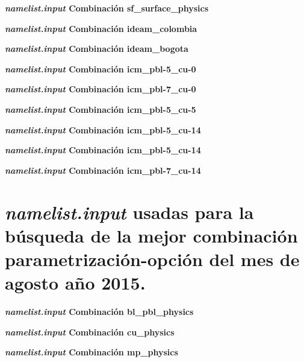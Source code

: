 \textbf{\textit{namelist.input}  Combinación sf\_surface\_physics}



\textbf{\textit{namelist.input}  Combinación ideam\_colombia}



\textbf{\textit{namelist.input}  Combinación ideam\_bogota}



\textbf{\textit{namelist.input}  Combinación icm\_pbl-5\_cu-0}



\textbf{\textit{namelist.input}  Combinación icm\_pbl-7\_cu-0}



\textbf{\textit{namelist.input}  Combinación icm\_pbl-5\_cu-5}



\textbf{\textit{namelist.input}  Combinación icm\_pbl-5\_cu-14}



\textbf{\textit{namelist.input}  Combinación icm\_pbl-5\_cu-14}



\textbf{\textit{namelist.input}  Combinación icm\_pbl-7\_cu-14}




\section{\textit{namelist.input} usadas para la búsqueda de la mejor combinación parametrización-opción del mes de agosto año 2015.}


\textbf{\textit{namelist.input}  Combinación bl\_pbl\_physics}



\textbf{\textit{namelist.input}  Combinación cu\_physics}



\textbf{\textit{namelist.input}  Combinación mp\_physics}



